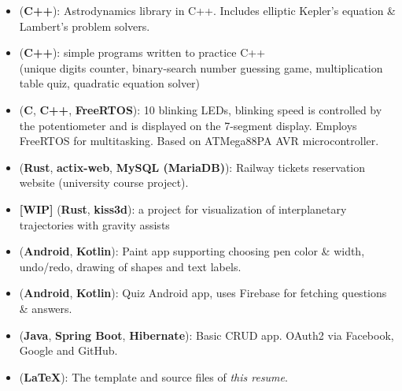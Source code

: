 \documentclass{resume}
\begin{document}
\begin{itemize}
	\item {}
		(\textbf{C++}):
		Astrodynamics library in C++. Includes elliptic Kepler's equation \& Lambert's problem solvers.
	\item {}
		(\textbf{C++}):
		simple programs written to practice C++\\
		(unique digits counter, binary-search number guessing game, multiplication table quiz, quadratic equation solver)
	\item {}
		(\textbf{C}, \textbf{C++}, \textbf{FreeRTOS}):
		10 blinking LEDs, blinking speed is controlled by the potentiometer and is displayed on the 7-segment display. Employs FreeRTOS for multitasking. Based on ATMega88PA AVR microcontroller.
	\item {}
		(\textbf{Rust}, \textbf{actix-web}, \textbf{MySQL (MariaDB)}):
		Railway tickets reservation website (university course project).
	\item {}
		\textbf{[WIP]} (\textbf{Rust}, \textbf{kiss3d}):
		a project for visualization of interplanetary trajectories with gravity assists
	\item {}
		(\textbf{Android}, \textbf{Kotlin}):
		Paint app supporting choosing pen color \& width, undo/redo, drawing of shapes and text labels.
	\item {}
		(\textbf{Android}, \textbf{Kotlin}):
		Quiz Android app, uses Firebase for fetching questions \& answers.
	\item {}
		(\textbf{Java}, \textbf{Spring Boot}, \textbf{Hibernate}):
		Basic CRUD app. OAuth2 via Facebook, Google and GitHub.
	\item {}
		(\textbf{\LaTeX}):
		The template and source files of \emph{this resume}.
\end{itemize}
\end{document}
